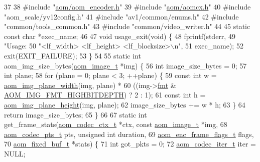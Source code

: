 \begin{DoxyCodeInclude}
37 
38 \textcolor{preprocessor}{#include "\hyperlink{aom__encoder_8h}{aom/aom\_encoder.h}"}
39 \textcolor{preprocessor}{#include "\hyperlink{aomcx_8h}{aom/aomcx.h}"}
40 \textcolor{preprocessor}{#include "aom\_scale/yv12config.h"}
41 \textcolor{preprocessor}{#include "av1/common/enums.h"}
42 \textcolor{preprocessor}{#include "common/tools\_common.h"}
43 \textcolor{preprocessor}{#include "common/video\_writer.h"}
44 
45 \textcolor{keyword}{static} \textcolor{keyword}{const} \textcolor{keywordtype}{char} *exec\_name;
46 
47 \textcolor{keywordtype}{void} usage\_exit(\textcolor{keywordtype}{void}) \{
48   fprintf(stderr,
49           \textcolor{stringliteral}{"Usage: %
50           \textcolor{stringliteral}{"<lf\_width> <lf\_height> <lf\_blocksize>\(\backslash\)n"},
51           exec\_name);
52   exit(EXIT\_FAILURE);
53 \}
54 
55 \textcolor{keyword}{static} \textcolor{keywordtype}{int} aom\_img\_size\_bytes(\hyperlink{structaom__image}{aom\_image\_t} *img) \{
56   \textcolor{keywordtype}{int} image\_size\_bytes = 0;
57   \textcolor{keywordtype}{int} plane;
58   \textcolor{keywordflow}{for} (plane = 0; plane < 3; ++plane) \{
59     \textcolor{keyword}{const} \textcolor{keywordtype}{int} w = \hyperlink{aom__image_8h_adfb2ea2e110ee42e38370868b64bf232}{aom\_img\_plane\_width}(img, plane) *
60                   ((img->\hyperlink{structaom__image_a6c64b1ab918d80d52eb8f5d6d957e825}{fmt} & \hyperlink{aom__image_8h_a607b37d91f75442f54223ecd85f1b6cb}{AOM\_IMG\_FMT\_HIGHBITDEPTH}) ? 2 : 1);
61     \textcolor{keyword}{const} \textcolor{keywordtype}{int} h = \hyperlink{aom__image_8h_ab87684a93e3da97bd6223d1e46876848}{aom\_img\_plane\_height}(img, plane);
62     image\_size\_bytes += w * h;
63   \}
64   \textcolor{keywordflow}{return} image\_size\_bytes;
65 \}
66 
67 \textcolor{keyword}{static} \textcolor{keywordtype}{int} get\_frame\_stats(\hyperlink{structaom__codec__ctx}{aom\_codec\_ctx\_t} *ctx, \textcolor{keyword}{const} 
      \hyperlink{structaom__image}{aom\_image\_t} *img,
68                            \hyperlink{group__encoder_ga958524226c9a65251c9e4f7bb78fc606}{aom\_codec\_pts\_t} pts, \textcolor{keywordtype}{unsigned} \textcolor{keywordtype}{int} duration,
69                            \hyperlink{group__encoder_gacbef92200b831adb94283f84128f83de}{aom\_enc\_frame\_flags\_t} flags,
70                            \hyperlink{structaom__fixed__buf}{aom\_fixed\_buf\_t} *stats) \{
71   \textcolor{keywordtype}{int} got\_pkts = 0;
72   \hyperlink{group__codec_gadf9e173c9e02788a9999399edab20a02}{aom\_codec\_iter\_t} iter = NULL;
}
\end{DoxyCodeInclude}
